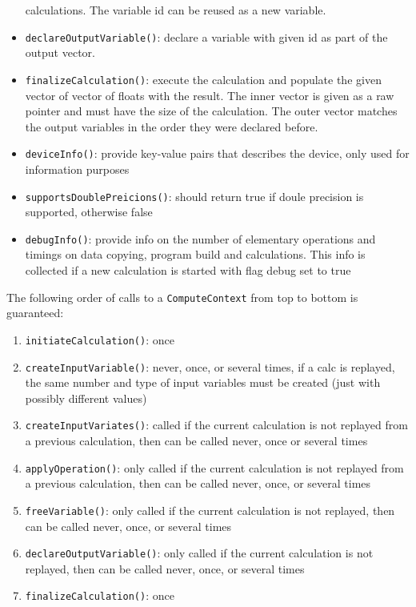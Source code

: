\documentclass[12pt, a4paper]{article}
\begin{document}
\begin{itemize}
  calculations. The variable id can be reused as a new variable.
\item \verb+declareOutputVariable()+: declare a variable with given id as part of the output vector.
\item \verb+finalizeCalculation()+: execute the calculation and populate the given vector of vector of floats with the
  result. The inner vector is given as a raw pointer and must have the size of the calculation. The outer vector matches
  the output variables in the order they were declared before.
\item \verb+deviceInfo()+: provide key-value pairs that describes the device, only used for information purposes
\item \verb+supportsDoublePreicions()+: should return true if doule precision is supported, otherwise false
\item \verb+debugInfo()+: provide info on the number of elementary operations and timings on data copying, program build
  and calculations. This info is collected if a new calculation is started with flag debug set to true
\end{itemize}

The following order of calls to a \verb+ComputeContext+ from top to bottom is guaranteed:

\begin{enumerate}
\item \verb+initiateCalculation()+: once
\item \verb+createInputVariable()+: never, once, or several times, if a calc is replayed, the same number and type of
  input variables must be created (just with possibly different values)
\item \verb+createInputVariates()+: called if the current calculation is not replayed from a previous calculation, then
  can be called never, once or several times
\item \verb+applyOperation()+: only called if the current calculation is not replayed from a previous calculation, then
  can be called never, once, or several times
\item \verb+freeVariable()+: only called if the current calculation is not replayed, then can be called never, once, or
  several times
\item \verb+declareOutputVariable()+: only called if the current calculation is not replayed, then can be called never,
  once, or several times
\item \verb+finalizeCalculation()+: once
\end{enumerate}
\end{document}
